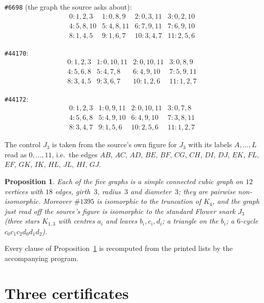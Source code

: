 \documentclass[11pt]{amsart}
\newtheorem{proposition}[theorem]{Proposition}
\theoremstyle{remark}
\newcommand{\HoG}[1]{\#\mathrm{#1}}
\begin{document}
\noindent\texttt{\#6698} (the graph the source asks about):
\[\begin{array}{llll}
 0\colon 1,2,3 & 1\colon 0,8,9 & 2\colon 0,3,11 & 3\colon 0,2,10\\
 4\colon 5,8,10 & 5\colon 4,8,11 & 6\colon 7,9,11 & 7\colon 6,9,10\\
 8\colon 1,4,5 & 9\colon 1,6,7 & 10\colon 3,4,7 & 11\colon 2,5,6
\end{array}\]

\noindent\texttt{\#44170}:
\[\begin{array}{llll}
 0\colon 1,2,3 & 1\colon 0,10,11 & 2\colon 0,10,11 & 3\colon 0,8,9\\
 4\colon 5,6,8 & 5\colon 4,7,8 & 6\colon 4,9,10 & 7\colon 5,9,11\\
 8\colon 3,4,5 & 9\colon 3,6,7 & 10\colon 1,2,6 & 11\colon 1,2,7
\end{array}\]

\noindent\texttt{\#44172}:
\[\begin{array}{llll}
 0\colon 1,2,3 & 1\colon 0,9,11 & 2\colon 0,10,11 & 3\colon 0,7,8\\
 4\colon 5,6,8 & 5\colon 4,9,10 & 6\colon 4,9,10 & 7\colon 3,8,11\\
 8\colon 3,4,7 & 9\colon 1,5,6 & 10\colon 2,5,6 & 11\colon 1,2,7
\end{array}\]

\noindent The control $J_3$ is taken from the source's own figure for $J_3$ with
its labels $A,\dots,L$ read as $0,\dots,11$, i.e.\ the edges
$AB$, $AC$, $AD$, $BE$, $BF$, $CG$, $CH$, $DI$, $DJ$, $EK$, $FL$, $EF$, $GK$,
$IK$, $HL$, $JL$, $HI$, $GJ$.

\begin{proposition}\label{prop:objects}
Each of the five graphs is a simple connected cubic graph on $12$ vertices with
$18$ edges, girth~$3$, radius~$3$ and diameter~$3$; they are pairwise
non-isomorphic. Moreover $\HoG{1395}$ is isomorphic to the truncation of $K_4$,
and the graph just read off the source's figure is isomorphic to the standard
Flower snark $J_3$ (three stars $K_{1,3}$ with centres $a_i$ and leaves
$b_i,c_i,d_i$; a triangle on the $b_i$; a $6$-cycle $c_0c_1c_2d_0d_1d_2$).
\end{proposition}

Every clause of Proposition~\ref{prop:objects} is recomputed from the printed
lists by the accompanying program.

\section{Three certificates}\label{sec:certs}
\end{document}
